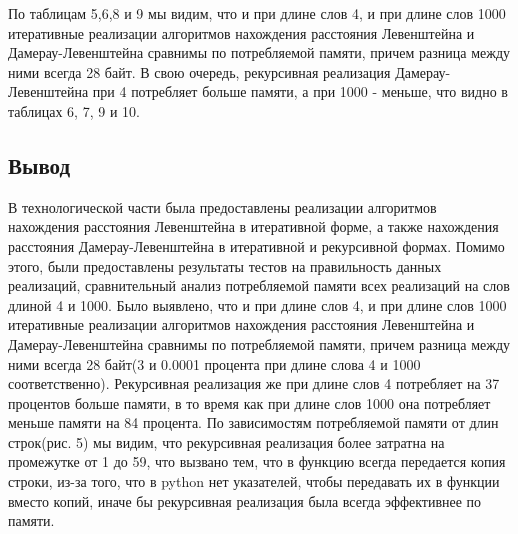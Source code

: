 \documentclass[a4paper, 14pt]{article}
\begin{document}
	
	\begin{flushleft}
	По таблицам 5,6,8 и 9 мы видим, что и при длине слов 4, и при длине слов 1000 итеративные реализации алгоритмов нахождения расстояния Левенштейна и Дамерау-Левенштейна сравнимы по потребляемой памяти, причем разница между ними всегда 28 байт. В свою очередь, рекурсивная реализация Дамерау-Левенштейна при 4 потребляет больше памяти, а при 1000 - меньше, что видно в таблицах 6, 7, 9 и 10.
	\end{flushleft}
  \begin{center}

   \subsection{Вывод}
    \end{center}  
    
	В технологической части была предоставлены реализации алгоритмов нахождения расстояния Левенштейна в итеративной форме, а также нахождения расстояния Дамерау-Левенштейна в итеративной и рекурсивной формах. Помимо этого, были предоставлены результаты тестов на правильность данных реализаций, сравнительный анализ потребляемой памяти всех реализаций на слов длиной 4 и 1000. Было выявлено, что и при длине слов 4, и при длине слов 1000 итеративные реализации алгоритмов нахождения расстояния Левенштейна и Дамерау-Левенштейна сравнимы по потребляемой памяти, причем разница между ними всегда 28 байт(3 и 0.0001 процента при длине слова 4 и 1000 соответственно). Рекурсивная реализация же при длине слов 4 потребляет на 37 процентов больше памяти, в то время как при длине слов 1000 она потребляет меньше памяти на 84 процента. По зависимостям потребляемой памяти от длин строк(рис. 5) мы видим, что рекурсивная реализация более затратна на промежутке от 1 до 59, что вызвано тем, что в функцию всегда передается копия строки, из-за того, что в python нет указателей, чтобы передавать их в функции вместо копий, иначе бы рекурсивная реализация была всегда эффективнее по памяти.	 
\end{document}
